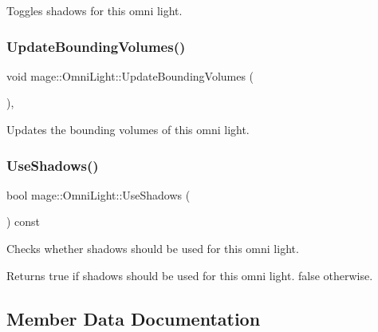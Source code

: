 Toggles shadows for this omni light. \hypertarget{classmage_1_1_omni_light_a6a10cdc0ed276d68e5378eaf934158e1}{}\label{classmage_1_1_omni_light_a6a10cdc0ed276d68e5378eaf934158e1} 
\subsubsection{\texorpdfstring{Update\+Bounding\+Volumes()}{UpdateBoundingVolumes()}}
{\footnotesize\ttfamily void mage\+::\+Omni\+Light\+::\+Update\+Bounding\+Volumes (\begin{DoxyParamCaption}{ }\end{DoxyParamCaption})\hspace{0.3cm}{\ttfamily [private]}, {\ttfamily [noexcept]}}

Updates the bounding volumes of this omni light. \hypertarget{classmage_1_1_omni_light_a8d58e7e1b26e54b3d9785ca79213cc4f}{}\label{classmage_1_1_omni_light_a8d58e7e1b26e54b3d9785ca79213cc4f} 
\subsubsection{\texorpdfstring{Use\+Shadows()}{UseShadows()}}
{\footnotesize\ttfamily bool mage\+::\+Omni\+Light\+::\+Use\+Shadows (\begin{DoxyParamCaption}{ }\end{DoxyParamCaption}) const\hspace{0.3cm}{\ttfamily [noexcept]}}

Checks whether shadows should be used for this omni light.

\begin{DoxyReturn}{Returns}
{\ttfamily true} if shadows should be used for this omni light. {\ttfamily false} otherwise. 
\end{DoxyReturn}


\subsection{Member Data Documentation}
\hypertarget{classmage_1_1_omni_light_adca1b76cdcc29215aae6f25ea57327c5}{}\label{classmage_1_1_omni_light_adca1b76cdcc29215aae6f25ea57327c5} 
